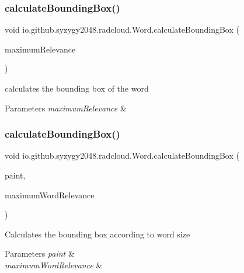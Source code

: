 \subsubsection{\texorpdfstring{calculate\+Bounding\+Box()}{calculateBoundingBox()}\hspace{0.1cm}{\footnotesize\ttfamily [1/2]}}
{\footnotesize\ttfamily void io.\+github.\+syzygy2048.\+radcloud.\+Word.\+calculate\+Bounding\+Box (\begin{DoxyParamCaption}\item[{float}]{maximum\+Relevance }\end{DoxyParamCaption})\hspace{0.3cm}{\ttfamily [inline]}}

calculates the bounding box of the word 
\begin{DoxyParams}{Parameters}
{\em maximum\+Relevance} & \\
\hline
\end{DoxyParams}
\mbox{\label{classio_1_1github_1_1syzygy2048_1_1radcloud_1_1_word_a3bd7b70cf654bbe3c0f6db2bfbaf0929}} 
\subsubsection{\texorpdfstring{calculate\+Bounding\+Box()}{calculateBoundingBox()}\hspace{0.1cm}{\footnotesize\ttfamily [2/2]}}
{\footnotesize\ttfamily void io.\+github.\+syzygy2048.\+radcloud.\+Word.\+calculate\+Bounding\+Box (\begin{DoxyParamCaption}\item[{Paint}]{paint,  }\item[{float}]{maximum\+Word\+Relevance }\end{DoxyParamCaption})\hspace{0.3cm}{\ttfamily [inline]}}

Calculates the bounding box according to word size 
\begin{DoxyParams}{Parameters}
{\em paint} & \\
\hline
{\em maximum\+Word\+Relevance} & \\
\hline
\end{DoxyParams}
\mbox{\label{classio_1_1github_1_1syzygy2048_1_1radcloud_1_1_word_ad35bce76832c85b100a4346da0f20a00}} 
